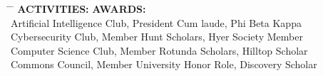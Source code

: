 \documentclass[a4paper,10pt]{article}
\begin{document}
\vspace{-5pt}
\begin{tabbing}
\hspace{4in} \= \hspace{2in} \= \kill
\textbf{ACTIVITIES:} \> \textbf{AWARDS:} \\
Artificial Intelligence Club, President \> Cum laude, Phi Beta Kappa \\
Cybersecurity Club, Member \> Hunt Scholars, Hyer Society Member \\
Computer Science Club, Member \> Rotunda Scholars, Hilltop Scholar  \\
Commons Council, Member \> University Honor Role, Discovery Scholar
\end{tabbing}
\end{document}
